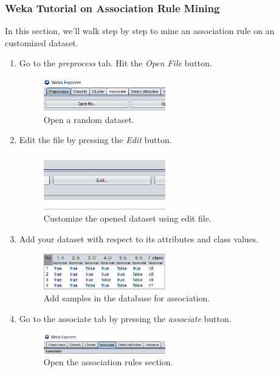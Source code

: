 \documentclass[12pt]{article}
\numberwithin{equation}{section}
\numberwithin{table}{section}
\numberwithin{figure}{section}
\begin{document}
\subsubsection*{Weka Tutorial on Association Rule Mining}
In this section, we'll walk step by step to mine an association rule on an customized dataset.
\begin{enumerate}
	\item Go to the \textit{preprocess} tab. Hit the \textit{Open File} button.
	\begin{figure}[!h] \centering
		\includegraphics[width=0.5\textwidth]{openfile.png}
		\caption{Open a random dataset.}
		\label{figsolplot1}
	\end{figure}
	\item Edit the file by pressing the \textit{Edit} button.
	\begin{figure}[!h] \centering
		\includegraphics[width=0.5\textwidth]{edit_file.png}
		\caption{Customize the opened dataset using edit file.}
		\label{figsolplot2}
	\end{figure}

	\item Add your dataset with respect to its attributes and class values.
	\begin{figure}[!h] \centering
		\includegraphics[width=0.5\textwidth]{data.png}
		\caption{Add samples in the database for association.}
		\label{figsolplot3}
	\end{figure}

	\item Go to the associate tab by pressing the \textit{associate} button.
	\begin{figure}[!h] \centering
		\includegraphics[width=0.5\textwidth]{associate.png}
		\caption{Open the association rules section.}
		\label{figsolplot}
	\end{figure}
	

\end{enumerate}
\end{document}
